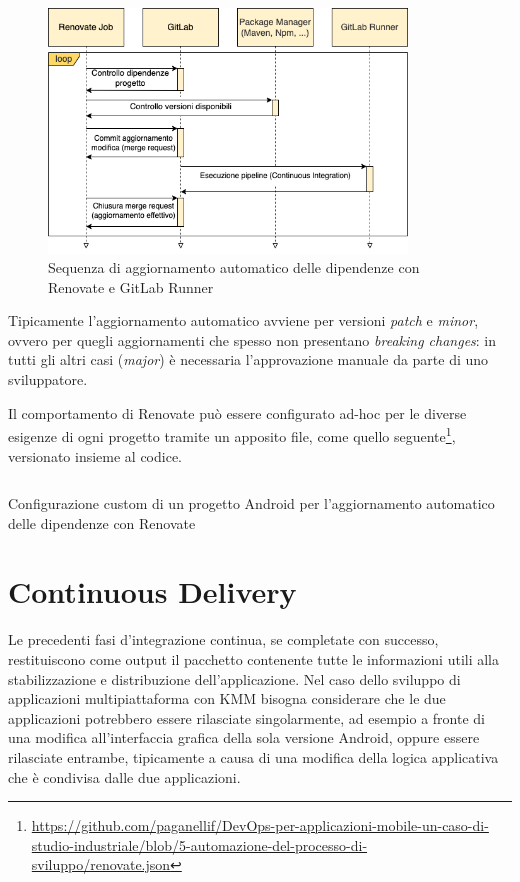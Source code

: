 \begin{figure}[H]
    \centering
    \includegraphics[width=0.85\textwidth]{img/renovate-uml-sequenza.png}
    \caption{Sequenza di aggiornamento automatico delle dipendenze con Renovate e GitLab Runner}
    \label{renovaflow}
\end{figure}

Tipicamente l'aggiornamento automatico avviene per versioni \textit{patch} e \textit{minor}, 
ovvero per quegli aggiornamenti che spesso non presentano \textit{breaking changes}: 
in tutti gli altri casi (\textit{major}) è necessaria l'approvazione manuale da parte di uno sviluppatore.

Il comportamento di Renovate può essere configurato ad-hoc per le diverse esigenze di ogni progetto tramite un apposito file, 
come quello seguente\footnote{\href{https://github.com/paganellif/DevOps-per-applicazioni-mobile-un-caso-di-studio-industriale/blob/5-automazione-del-processo-di-sviluppo/renovate.json}{https://github.com/paganellif/DevOps-per-applicazioni-mobile-un-caso-di-studio-industriale/blob/5-automazione-del-processo-di-sviluppo/renovate.json}},
versionato insieme al codice.

\begin{listing}[H]
    \inputminted{json}{code/renovate.json}
    \caption{Configurazione custom di un progetto Android per l'aggiornamento automatico delle dipendenze con Renovate}
\end{listing}

\section{Continuous Delivery}
Le precedenti fasi d'integrazione continua, 
se completate con successo, 
restituiscono come output il pacchetto contenente tutte le informazioni utili alla stabilizzazione e distribuzione dell'applicazione. 
Nel caso dello sviluppo di applicazioni multipiattaforma con KMM bisogna considerare che le due applicazioni potrebbero essere rilasciate singolarmente, 
ad esempio a fronte di una modifica all'interfaccia grafica della sola versione Android, 
oppure essere rilasciate entrambe,
tipicamente a causa di una modifica della logica applicativa che è condivisa dalle due applicazioni.

